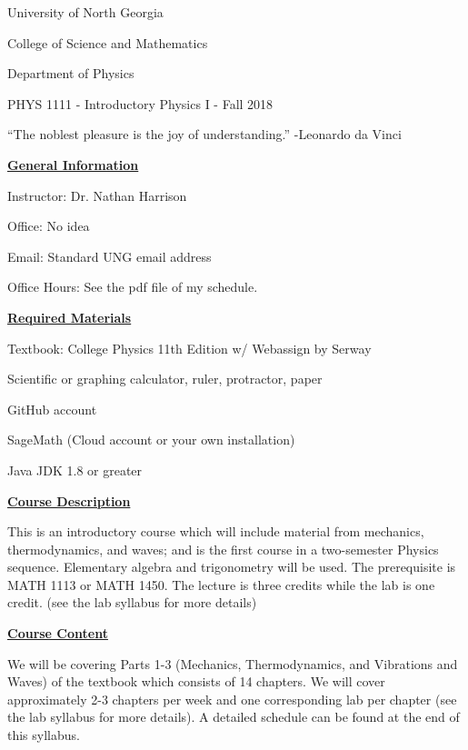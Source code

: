 \documentclass[12pt]{article}
\begin{document}
{\centering
\large University of North Georgia \par
\large College of Science and Mathematics \par
\large Department of Physics \par
\large PHYS 1111 - Introductory Physics I - Fall 2018 \par
}
\hfill \break \vspace{-4mm}

``The noblest pleasure is the joy of understanding.'' -Leonardo da Vinci
\hfill \break

\underline{\textbf{General Information}} \par
Instructor: Dr. Nathan Harrison \par
Office: No idea \par
Email: Standard UNG email address \par
Office Hours: See the pdf file of my schedule.
\hfill \break

\underline{\textbf{Required Materials}} \par
Textbook: College Physics 11th Edition w/ Webassign by Serway \par
Scientific or graphing calculator, ruler, protractor, paper \par
GitHub account \par
SageMath (Cloud account or your own installation) \par
Java JDK 1.8 or greater
\hfill \break

\underline{\textbf{Course Description}} \par
This is an introductory course which will include material from mechanics, thermodynamics, and waves;
and is the first course in a two-semester Physics sequence.
Elementary algebra and trigonometry will be used.
The prerequisite is MATH 1113 or MATH 1450.
The lecture is three credits while the lab is one credit. (see the lab syllabus for more details)
\hfill \break

\underline{\textbf{Course Content}} \par
We will be covering Parts 1-3 (Mechanics, Thermodynamics, and Vibrations and Waves) of the textbook which consists of 14 chapters.
We will cover approximately 2-3 chapters per week and one corresponding lab per chapter (see the lab syllabus for more details). A detailed schedule can be found at the end of this syllabus.
\hfill \break
\end{document}

